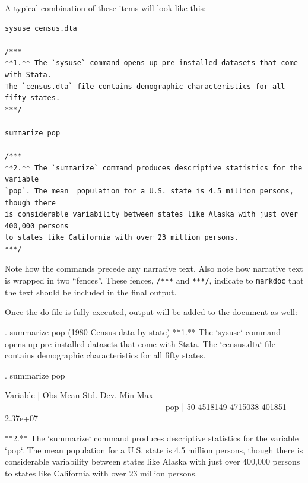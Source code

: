 \documentclass[]{book}
\newenvironment{Shaded}{\begin{snugshade}}{\end{snugshade}}
\newcommand{\BaseNTok}[1]{\textcolor[rgb]{0.00,0.00,0.81}{{#1}}}
\newcommand{\NormalTok}[1]{{#1}}
\begin{document}
A typical combination of these items will look like this:

\begin{verbatim}
sysuse census.dta

/***
**1.** The `sysuse` command opens up pre-installed datasets that come with Stata. 
The `census.dta` file contains demographic characteristics for all fifty states.
***/

summarize pop

/***
**2.** The `summarize` command produces descriptive statistics for the variable 
`pop`. The mean  population for a U.S. state is 4.5 million persons, though there 
is considerable variability between states like Alaska with just over 400,000 persons 
to states like California with over 23 million persons.
***/
\end{verbatim}

Note how the commands precede any narrative text. Also note how
narrative text is wrapped in two ``fences''. These fences, \texttt{/***}
and \texttt{***/}, indicate to \texttt{markdoc} that the text should be
included in the final output.

Once the do-file is fully executed, output will be added to the document
as well:

\begin{Shaded}
\begin{Highlighting}[]

\BaseNTok{          . summarize pop}
\BaseNTok{          (1980 Census data by state)}
\BaseNTok{          }
\NormalTok{**1.** The }\BaseNTok{`sysuse`} \NormalTok{command opens up pre-installed datasets that come with Stata. The }
\BaseNTok{`census.dta`} \NormalTok{file contains demographic characteristics for all fifty states.}

\BaseNTok{          . summarize pop}

\BaseNTok{              Variable |        Obs        Mean    Std. Dev.       Min        Max}
\NormalTok{          -------------+---------------------------------------------------------}
\BaseNTok{                   pop |         50     4518149     4715038     401851   2.37e+07}

\NormalTok{**2.** The }\BaseNTok{`summarize`} \NormalTok{command produces descriptive statistics for the variable }\BaseNTok{`pop`}\NormalTok{. }
\NormalTok{The mean population for a U.S. state is 4.5 million persons, though there is }
\NormalTok{considerable variability between states like Alaska with just over 400,000 persons }
\NormalTok{to states like California with over 23 million persons.}
\end{Highlighting}
\end{Shaded}
\end{document}
